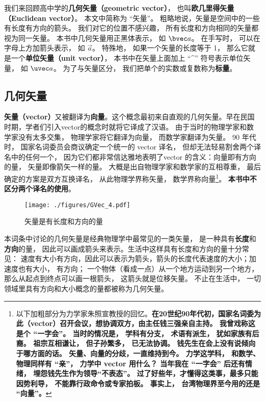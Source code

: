 

我们来回顾高中学的\textbf{几何矢量（geometric vector）}， 也叫\textbf{欧几里得矢量（Euclidean vector）}。 本文中简称为 “矢量”。 粗略地说，矢量是空间中的一些有长度有方向的箭头。 我们对它的位置不感兴趣， 所有长度和方向相同的矢量都视为同一矢量。 本书中几何矢量用正黑体表示， 如 $\bvec a$。 在手写时， 可以在字母上方加箭头表示， 如 $\overrightarrow{a}$。 特殊地， 如果一个矢量的长度等于 1， 那么它就是一个\textbf{单位矢量（unit vector）}， 本书中在矢量上面加上 “\^{}” 符号表示单位矢量， 如 $\uvec a$。 为了与矢量区分， 我们把单个的实数或复数称为\textbf{标量}。

\subsection{几何矢量}

\textbf{矢量（vector）}又被翻译为\textbf{向量}。这个概念最初来自直观的几何矢量。早在民国时期，学者们引入vector的概念时就将它译成了汉语。 由于当时的物理学家和数学家没有太多交集， 物理学家将它翻译为向量， 而数学家翻译为矢量。 90 年代时， 国家名词委员会商议确定一个统一的 vector 译名， 但却无法轻易割舍两个译名中的任何一个， 因为它们都非常信达雅地表明了vector 的含义：向量即有方向的量， 矢量即像箭矢一样的量。 大概是出自物理学家和数学家的互相尊重， 最后确定的方案是双方互换译名， 从此物理学界称矢量， 数学界称向量\footnote{以下加粗部分为力学家朱照宣教授的回忆。\textbf{在20世纪90年代初，国家名词委为此（vector）召开会议，想协调双方，由主任钱三强亲自主持。 我曾戏称这是个 “一字会”。 当时的情况是， 学科有分支， 术语有派生， 犹如家族有后裔。 祖宗互相谦让， 但子孙繁多， 已无法协调。 钱先生在会上没有说倾向于哪方面的话。 矢量、向量的分歧，一直维持到今。 力学这学科， 和数学、物理同样有 “亲”， 力学中 vector 用什么？ 当年我在 “一字会” 后还有情绪， 埋怨钱先生作为领导“不表态”。 过了好些年，才懂得这类事，最多只能因势利导， 不能靠行政命令或专家拍板。 事实上， 台湾物理界至今用的还是 “向量”。}}。 \textbf{本书中不区分两个译名的使用}。
\begin{figure}[ht]
\centering
\texttt{[image: ./figures/GVec\_4.pdf]}
\caption{矢量是有长度和方向的量} \label{GVec_fig4}
\end{figure}
本词条中讨论的几何矢量是经典物理学中最常见的一类矢量， 是一种具有\textbf{长度}和\textbf{方向}的量， 因此可以画成箭头来表示。生活中这样具有长度和方向的量十分常见： 速度有大小有方向，因此可以表示为箭头，箭头的长度代表速度的大小；加速度也有大小， 有方向； 一个物体（看成一点）从一个地方运动到另一个地方，那么从起点到终点可以画一根箭头， 这箭头就是位移矢量。 不止在生活中， 一切领域里具有方向和大小概念的量都被称为几何矢量。 

